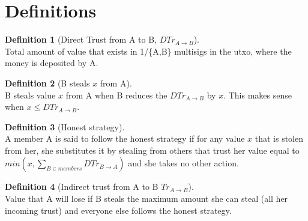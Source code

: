 \documentclass[11pt]{article}
\theoremstyle{definition}
\newtheorem{definition}{Definition}[section]
\theoremstyle{corollary}
\begin{document}
  \section{Definitions}
      \begin{definition}[Direct Trust from A to B, $DTr_{A \rightarrow B}$] \ \\
         Total amount of value that exists in 1/\{A,B\} multisigs in the utxo, where the money is deposited by A.
      \end{definition}
      \begin{definition}[B steals $x$ from A] \ \\
         B steals value $x$ from A when B reduces the $DTr_{A \rightarrow B}$ by $x$. This makes sense when 
         $x \leq DTr_{A \rightarrow B}$.
      \end{definition}
      \begin{definition}[Honest strategy] \ \\
         A member A is said to follow the honest strategy if for any value $x$ that is stolen from her, she
         substitutes it by stealing from others that trust her value equal to
         $min(x,\sum_{B \in members}{DTr_{B \rightarrow A}})$ and she takes no other action.
      \end{definition}
      \begin{definition}[Indirect trust from A to B $Tr_{A \rightarrow B}$] \ \\
         Value that A will lose if B steals the maximum amount she can steal (all her incoming trust) and everyone
         else follows the honest strategy.
      \end{definition}
\end{document}
